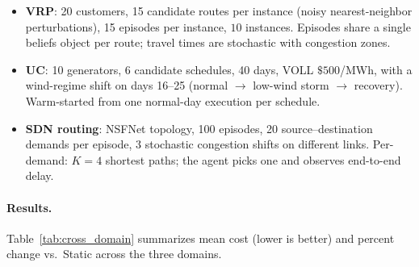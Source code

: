 \documentclass[11pt]{article}
\theoremstyle{definition}
\theoremstyle{remark}
\begin{document}
\begin{itemize}[leftmargin=1.2em,itemsep=0.2em]
\item \textbf{VRP}: 20 customers, 15 candidate routes per instance
  (noisy nearest-neighbor perturbations), 15 episodes per instance,
  $10$ instances. Episodes share a single beliefs object per route;
  travel times are stochastic with congestion zones.
\item \textbf{UC}: 10 generators, 6 candidate schedules, 40 days,
  VOLL $\$500$/MWh, with a wind-regime shift on days 16--25
  (normal $\to$ low-wind storm $\to$ recovery). Warm-started from
  one normal-day execution per schedule.
\item \textbf{SDN routing}: NSFNet topology, 100 episodes, 20
  source--destination demands per episode, 3 stochastic congestion
  shifts on different links. Per-demand: $K{=}4$ shortest paths;
  the agent picks one and observes end-to-end delay.
\end{itemize}

\paragraph{Results.}
Table~\ref{tab:cross_domain} summarizes mean cost (lower is better)
and percent change vs.\ Static across the three domains.
\end{document}
